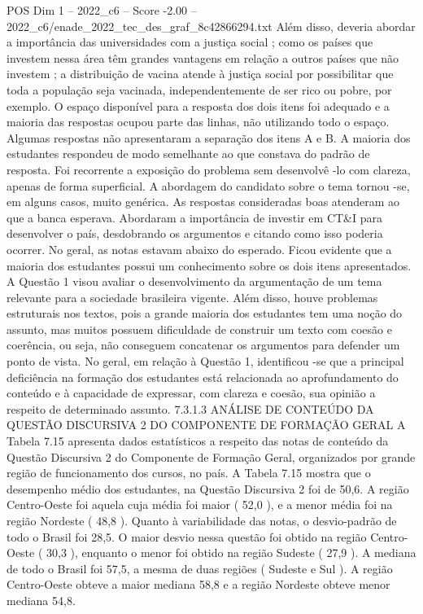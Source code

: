\begin{textsample}{POS Dim 1 – 2022\_c6 – Score -2.00 – 2022\_c6/enade\_2022\_tec\_des\_graf\_8c42866294.txt}
Além disso, deveria abordar a importância das universidades com a justiça social ; como os países que investem nessa área têm grandes vantagens em relação a outros países que não investem ; a distribuição de vacina atende à justiça social por possibilitar que toda a população seja vacinada, independentemente de ser rico ou pobre, por exemplo.
O espaço disponível para a resposta dos dois itens foi adequado e a maioria das respostas ocupou parte das linhas, não utilizando todo o espaço.
Algumas respostas não apresentaram a separação dos itens A e B.
A maioria dos estudantes respondeu de modo semelhante ao que constava do padrão de resposta.
Foi recorrente a exposição do problema sem desenvolvê -lo com clareza, apenas de forma superficial.
A abordagem do candidato sobre o tema tornou -se, em alguns casos, muito genérica.
As respostas consideradas boas atenderam ao que a banca esperava.
Abordaram a importância de investir em CT\&I para desenvolver o país, desdobrando os argumentos e citando como isso poderia ocorrer.
No geral, as notas estavam abaixo do esperado.
Ficou evidente que a maioria dos estudantes possui um conhecimento sobre os dois itens apresentados.
A Questão 1 visou avaliar o desenvolvimento da argumentação de um tema relevante para a sociedade brasileira vigente.
Além disso, houve problemas estruturais nos textos, pois a grande maioria dos estudantes tem uma noção do assunto, mas muitos possuem dificuldade de construir um texto com coesão e coerência, ou seja, não conseguem concatenar os argumentos para defender um ponto de vista.
No geral, em relação à Questão 1, identificou -se que a principal deficiência na formação dos estudantes está relacionada ao aprofundamento do conteúdo e à capacidade de expressar, com clareza e coesão, sua opinião a respeito de determinado assunto. 7.3.1.3 ANÁLISE DE CONTEÚDO DA QUESTÃO DISCURSIVA 2 DO COMPONENTE DE FORMAÇÃO GERAL A Tabela 7.15 apresenta dados estatísticos a respeito das notas de conteúdo da Questão Discursiva 2 do Componente de Formação Geral, organizados por grande região de funcionamento dos cursos, no país.
A Tabela 7.15 mostra que o desempenho médio dos estudantes, na Questão Discursiva 2 foi de 50,6.
A região Centro-Oeste foi aquela cuja média foi maior ( 52,0 ), e a menor média foi na região Nordeste ( 48,8 ).
Quanto à variabilidade das notas, o desvio-padrão de todo o Brasil foi 28,5.
O maior desvio nessa questão foi obtido na região Centro-Oeste ( 30,3 ), enquanto o menor foi obtido na região Sudeste ( 27,9 ).
A mediana de todo o Brasil foi 57,5, a mesma de duas regiões ( Sudeste e Sul ).
A região Centro-Oeste obteve a maior mediana 58,8 e a região Nordeste obteve menor mediana 54,8.

\end{textsample}
